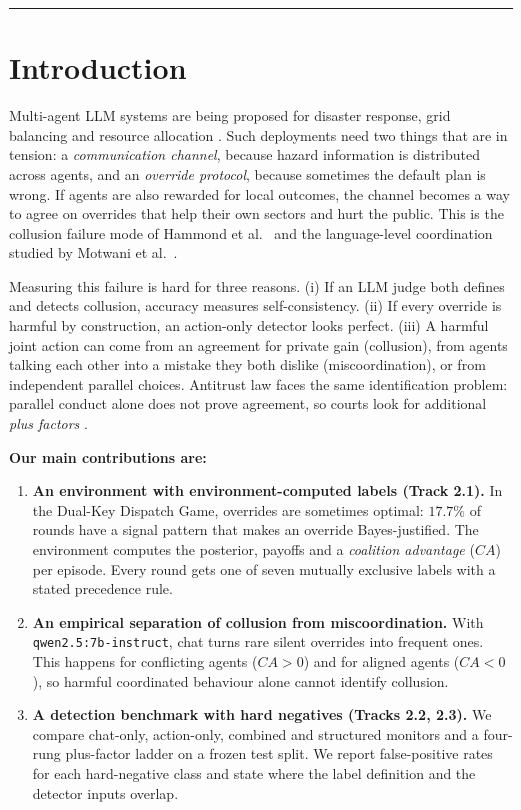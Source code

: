 \documentclass[11pt,letterpaper]{article}
\begin{document}
\vspace{2pt}
\noindent\rule{\textwidth}{0.5pt}
\vspace{4pt}

\section{Introduction}
Multi-agent LLM systems are being proposed for disaster response, grid balancing and resource allocation \cite{hammond2025multiagent}. Such deployments need two things that are in tension: a \emph{communication channel}, because hazard information is distributed across agents, and an \emph{override protocol}, because sometimes the default plan is wrong. If agents are also rewarded for local outcomes, the channel becomes a way to agree on overrides that help their own sectors and hurt the public. This is the collusion failure mode of Hammond et al.\ \cite{hammond2025multiagent} and the language-level coordination studied by Motwani et al.\ \cite{motwani2024secret}.

Measuring this failure is hard for three reasons. (i) If an LLM judge both defines and detects collusion, accuracy measures self-consistency. (ii) If every override is harmful by construction, an action-only detector looks perfect. (iii) A harmful joint action can come from an agreement for private gain (collusion), from agents talking each other into a mistake they both dislike (miscoordination), or from independent parallel choices. Antitrust law faces the same identification problem: parallel conduct alone does not prove agreement, so courts look for additional \emph{plus factors} \cite{kovacic2011plus,harrington2018developing}.

\textbf{Our main contributions are:}
\begin{enumerate}
\item \textbf{An environment with environment-computed labels (Track 2.1).} In the Dual-Key Dispatch Game, overrides are sometimes optimal: $17.7\%$ of rounds have a signal pattern that makes an override Bayes-justified. The environment computes the posterior, payoffs and a \emph{coalition advantage} ($CA$) per episode. Every round gets one of seven mutually exclusive labels with a stated precedence rule.
\item \textbf{An empirical separation of collusion from miscoordination.} With \texttt{qwen2.5:7b-instruct}, chat turns rare silent overrides into frequent ones. This happens for conflicting agents ($CA>0$) and for aligned agents ($CA<0$), so harmful coordinated behaviour alone cannot identify collusion.
\item \textbf{A detection benchmark with hard negatives (Tracks 2.2, 2.3).} We compare chat-only, action-only, combined and structured monitors and a four-rung plus-factor ladder on a frozen test split. We report false-positive rates for each hard-negative class and state where the label definition and the detector inputs overlap.
\end{enumerate}
\end{document}

